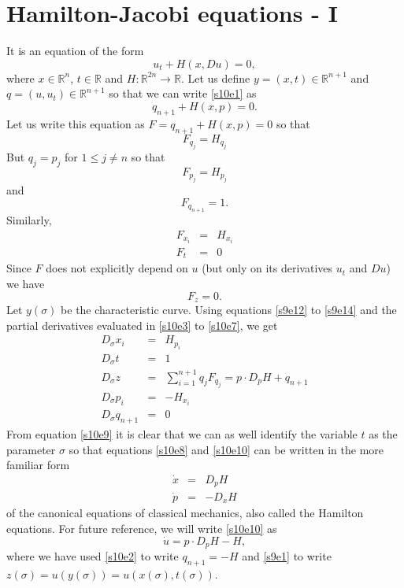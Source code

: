 \documentclass{article}
\theoremstyle{plain}
\numberwithin{thm}{section}
\theoremstyle{plain}
\numberwithin{prop}{section}
\theoremstyle{definition}
\numberwithin{defn}{section}
\theoremstyle{remark}
\numberwithin{equation}{section}
\begin{document}
\section{Hamilton-Jacobi equations - I}\label{s10}
It is an equation of the form
\begin{equation}\label{s10e1}
u_t + H(x, Du) = 0,
\end{equation}
where $x \in \mathbb{R}^n$, $t \in \mathbb{R}$ and $H: \mathbb{R}^{2n} \rightarrow \mathbb{R}$.
Let us define $y = (x, t) \in \mathbb{R}^{n+1}$ and $q = (u, u_t) \in \mathbb{R}^{n+1}$ so that
we can write \eqref{s10e1} as
\begin{equation}\label{s10e2}
q_{n+1} + H(x, p) = 0.
\end{equation}
Let us write this equation as $F = q_{n+1} + H(x, p) = 0$ so that
\[
F_{q_j} = H_{q_j}
\]
But $q_j = p_j$ for $1 \le j \ne n$ so that
\begin{equation}\label{s10e3}
F_{p_j} = H_{p_j}
\end{equation}
and
\begin{equation}\label{s10e4}
F_{q_{n+1}} = 1.
\end{equation}
Similarly,
\begin{eqnarray}
F_{x_i} &=& H_{x_i} \label{s10e5} \\
F_{t} &=& 0 \label{s10e6}
\end{eqnarray}
Since $F$ does not explicitly depend on $u$ (but only on its derivatives $u_t$ and $Du$) we have
\begin{equation}\label{s10e7}
F_z = 0.
\end{equation}
Let $y(\sigma)$ be the characteristic curve. Using equations \eqref{s9e12} to \eqref{s9e14} and
the partial derivatives evaluated in \eqref{s10e3} to \eqref{s10e7}, we get
\begin{eqnarray}
D_\sigma x_i &=& H_{p_i} \label{s10e8} \\
D_\sigma t &=& 1 \label{s10e9} \\
D_\sigma z &=& \sum_{i=1}^{n+1} q_j F_{q_j} = p \cdot D_p H + q_{n+1}\label{s10e10} \\
D_\sigma p_i &=& -H_{x_i} \label{s10e11} \\
D_\sigma q_{n+1} &=& 0 \label{s10e12}
\end{eqnarray}
From equation \eqref{s10e9} it is clear that we can as well identify the variable $t$ as the
parameter $\sigma$ so that equations \eqref{s10e8} and \eqref{s10e10} can be written in the more
familiar form
\begin{eqnarray}
\dot{x} &=& D_p H \label{s10e13} \\
\dot{p} &=& -D_x H \label{s10e14}
\end{eqnarray}
of the canonical equations of classical mechanics, also called the Hamilton equations. For future
reference, we will write \eqref{s10e10} as
\begin{equation}\label{s10e15}
\dot{u} = p \cdot D_p H - H,
\end{equation}
where we have used \eqref{s10e2} to write $q_{n+1} = -H$ and \eqref{s9e1} to write $z(\sigma) = 
u(y(\sigma)) = u(x(\sigma), t(\sigma))$.
\end{document}

